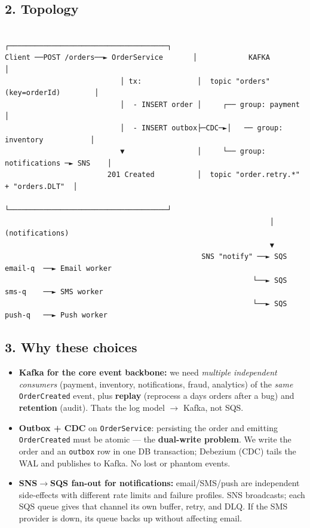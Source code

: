 \documentclass[11pt]{article}
\providecommand{\tightlist}{\setlength{\itemsep}{1pt}\setlength{\parskip}{0pt}}
\begin{document}
\subsection{2. Topology}\label{2-topology}

\setcodelang{}

\begin{verbatim}
                                            ┌─────────────────────────────────────┐
Client ──POST /orders──► OrderService       │            KAFKA                      │
                           │ tx:             │  topic "orders"  (key=orderId)        │
                           │  - INSERT order │     ┌── group: payment                │
                           │  - INSERT outbox├─CDC─►│   ── group: inventory           │
                           ▼                 │     └── group: notifications ─► SNS    │
                        201 Created          │  topic "order.retry.*" + "orders.DLT"  │
                                             └─────────────────────────────────────┘
                                                              │ (notifications)
                                                              ▼
                                              SNS "notify" ──► SQS email-q  ──► Email worker
                                                          └──► SQS sms-q    ──► SMS worker
                                                          └──► SQS push-q   ──► Push worker
\end{verbatim}

\subsection{3. Why these choices}\label{3-why-these-choices}

\begin{itemize}
\tightlist
\item
  \textbf{Kafka for the core event backbone:} we need \emph{multiple independent consumers} (payment, inventory, notifications, fraud, analytics) of the \emph{same} \texttt{OrderCreated} event, plus \textbf{replay} (reprocess a day\textquotesingle s orders after a bug) and \textbf{retention} (audit). That\textquotesingle s the log model \(\rightarrow\) Kafka, not SQS.
\item
  \textbf{Outbox + CDC} on \texttt{OrderService}: persisting the order and emitting \texttt{OrderCreated} must be atomic --- the \textbf{dual-write problem}. We write the order and an \texttt{outbox} row in one DB transaction; Debezium (CDC) tails the WAL and publishes to Kafka. No lost or phantom events.
\item
  \textbf{SNS\(\rightarrow\)SQS fan-out for notifications:} email/SMS/push are independent side-effects with different rate limits and failure profiles. SNS broadcasts; each SQS queue gives that channel its own buffer, retry, and DLQ. If the SMS provider is down, its queue backs up without affecting email.
\end{itemize}
\end{document}
